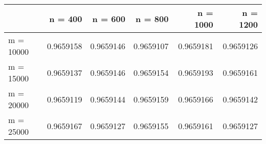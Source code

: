 \begin{tabular}{lrrrrr}
\toprule
{} &    n = 400 &    n = 600 &    n = 800 &   n = 1000 &   n = 1200 \\
\midrule
m = 10000 &  0.9659158 &  0.9659146 &  0.9659107 &  0.9659181 &  0.9659126 \\
m = 15000 &  0.9659137 &  0.9659146 &  0.9659154 &  0.9659193 &  0.9659161 \\
m = 20000 &  0.9659119 &  0.9659144 &  0.9659159 &  0.9659166 &  0.9659142 \\
m = 25000 &  0.9659167 &  0.9659127 &  0.9659155 &  0.9659161 &  0.9659127 \\
\bottomrule
\end{tabular}
